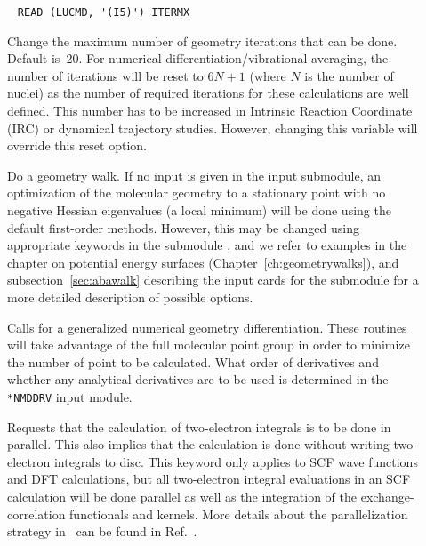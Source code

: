 \begin{description}
\item[]\verb| |\newline
\verb|READ (LUCMD, '(I5)') ITERMX|

Change the maximum number of geometry iterations
that can be done. Default
is~20.  For numerical
differentiation/vibrational averaging, the number of iterations will
be reset to $6N+1$ (where $N$ is the number of nuclei) as the number
of required iterations for these calculations are well
defined. This number has to be increased in Intrinsic Reaction Coordinate
(IRC) or dynamical
trajectory studies. However, changing this variable will override this reset
option.


\item[] Do a geometry walk. If no
input is given in the
 input submodule, an optimization of the molecular
geometry to a stationary point with no
negative Hessian eigenvalues (a
local minimum) will be done using the default first-order
methods. However, this may be changed using appropriate
keywords in the submodule , and we refer to examples in
the chapter on potential energy surfaces
(Chapter~\ref{ch:geometrywalks}), and  subsection~\ref{sec:abawalk}
describing the input cards for the  submodule for a more
detailed description of possible options.

\item[] Calls for a generalized numerical geometry
differentiation. These routines will take advantage of the full
molecular point group in order to minimize the number of point to be
calculated. What order of derivatives and whether any analytical
derivatives are to be used is determined in the \verb|*NMDDRV| input
module. 

\item[] Requests that the calculation of two-electron
integrals
is to be done in parallel. This also
implies that the calculation is
done without writing two-electron integrals to disc. This keyword only
applies to SCF wave
functions and DFT calculations, but all two-electron integral
evaluations in an SCF calculation will be done parallel as well as the integration of the exchange-correlation functionals and kernels. More details
about the parallelization strategy in \siraba\ can be found
in Ref.~\cite{pndjhapdkrthhkcpl253}.


\end{description}
